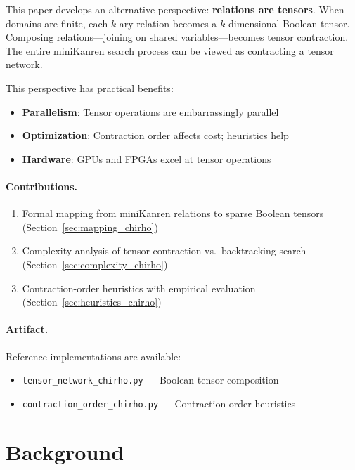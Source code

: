 \documentclass[11pt,a4paper]{article}
\begin{document}
This paper develops an alternative perspective: \textbf{relations are tensors}.
When domains are finite, each $k$-ary relation becomes a $k$-dimensional Boolean tensor.
Composing relations---joining on shared variables---becomes tensor contraction.
The entire miniKanren search process can be viewed as contracting a tensor network.

This perspective has practical benefits:
\begin{itemize}
  \item \textbf{Parallelism}: Tensor operations are embarrassingly parallel
  \item \textbf{Optimization}: Contraction order affects cost; heuristics help
  \item \textbf{Hardware}: GPUs and FPGAs excel at tensor operations
\end{itemize}

\paragraph{Contributions.}
\begin{enumerate}
  \item Formal mapping from miniKanren relations to sparse Boolean tensors (Section~\ref{sec:mapping_chirho})
  \item Complexity analysis of tensor contraction vs.\ backtracking search (Section~\ref{sec:complexity_chirho})
  \item Contraction-order heuristics with empirical evaluation (Section~\ref{sec:heuristics_chirho})
\end{enumerate}

\paragraph{Artifact.}
Reference implementations are available:
\begin{itemize}
  \item \texttt{tensor\_network\_chirho.py} --- Boolean tensor composition
  \item \texttt{contraction\_order\_chirho.py} --- Contraction-order heuristics
\end{itemize}

\section{Background}
\label{sec:background_chirho}
\end{document}
